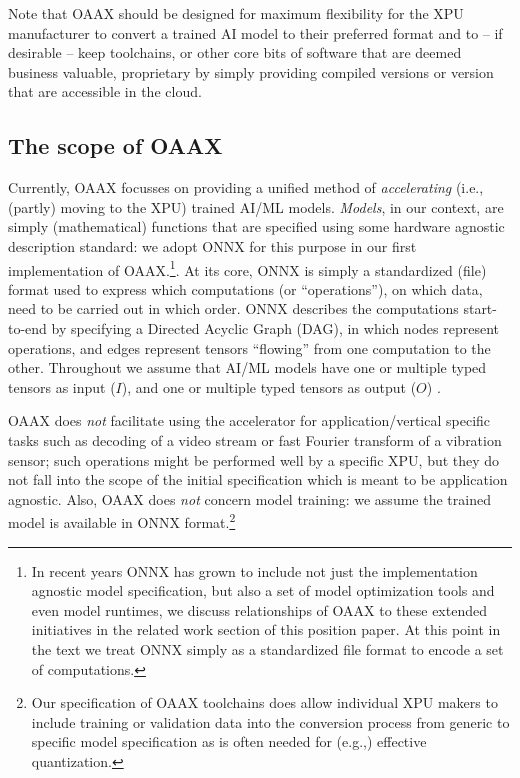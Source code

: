 \documentclass{article}
\begin{document}
Note that OAAX should be designed for maximum flexibility for the XPU manufacturer to convert a trained AI model to their preferred format and to -- if desirable -- keep toolchains, or other core bits of software that are deemed business valuable, proprietary by simply providing compiled versions or version that are accessible in the cloud.

\subsection{The scope of OAAX}

Currently, OAAX focusses on providing a unified method of \emph{accelerating} (i.e., (partly) moving to the XPU) trained AI/ML models. \emph{Models}, in our context, are simply (mathematical) functions that are specified using some hardware agnostic description standard: we adopt ONNX \cite{ONNX} for this purpose in our first implementation of OAAX.\footnote{In recent years ONNX has grown to include not just the implementation agnostic model specification, but also a set of model optimization tools and even model runtimes, we discuss relationships of OAAX to these extended initiatives in the related work section of this position paper. At this point in the text we treat ONNX simply as a standardized file format to encode a set of computations.}. At its core, ONNX is simply a standardized (file) format used to express which computations (or ``operations''), on which data, need to be carried out in which order. ONNX describes the computations start-to-end by specifying a Directed Acyclic Graph (DAG), in which nodes represent operations, and edges represent tensors ``flowing'' from one computation to the other. Throughout we assume that AI/ML models have one or multiple typed tensors as input ($I$), and  one or multiple typed tensors as output ($O$) .

OAAX does \emph{not} facilitate using the accelerator for application/vertical specific tasks such as decoding of a video stream or fast Fourier transform of a vibration sensor; such operations might be performed well by a specific XPU, but they do not fall into the scope of the initial  specification which is meant to be application agnostic. Also, OAAX does \emph{not} concern model training: we assume the trained model is available in ONNX format.\footnote{Our specification of OAAX toolchains does allow individual XPU makers to include training or validation data into the conversion process from generic to specific model specification as is often needed for (e.g.,) effective quantization.}
\end{document}
